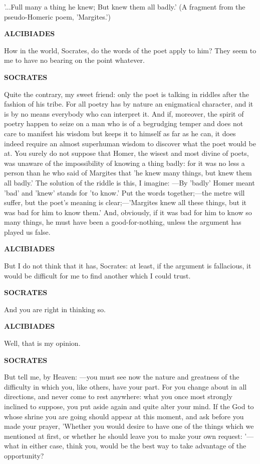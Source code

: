 \documentclass[11pt,letter]{article}
\begin{document}
\par  '...Full many a thing he knew; But knew them all badly.' (A fragment from the pseudo-Homeric poem, 'Margites.')

\par \textbf{ALCIBIADES}
\par   How in the world, Socrates, do the words of the poet apply to him? They seem to me to have no bearing on the point whatever.

\par \textbf{SOCRATES}
\par   Quite the contrary, my sweet friend:  only the poet is talking in riddles after the fashion of his tribe. For all poetry has by nature an enigmatical character, and it is by no means everybody who can interpret it. And if, moreover, the spirit of poetry happen to seize on a man who is of a begrudging temper and does not care to manifest his wisdom but keeps it to himself as far as he can, it does indeed require an almost superhuman wisdom to discover what the poet would be at. You surely do not suppose that Homer, the wisest and most divine of poets, was unaware of the impossibility of knowing a thing badly:  for it was no less a person than he who said of Margites that 'he knew many things, but knew them all badly.' The solution of the riddle is this, I imagine: —By 'badly' Homer meant 'bad' and 'knew' stands for 'to know.' Put the words together;—the metre will suffer, but the poet's meaning is clear;—'Margites knew all these things, but it was bad for him to know them.' And, obviously, if it was bad for him to know so many things, he must have been a good-for-nothing, unless the argument has played us false.

\par \textbf{ALCIBIADES}
\par   But I do not think that it has, Socrates:  at least, if the argument is fallacious, it would be difficult for me to find another which I could trust.

\par \textbf{SOCRATES}
\par   And you are right in thinking so.

\par \textbf{ALCIBIADES}
\par   Well, that is my opinion.

\par \textbf{SOCRATES}
\par   But tell me, by Heaven: —you must see now the nature and greatness of the difficulty in which you, like others, have your part. For you change about in all directions, and never come to rest anywhere:  what you once most strongly inclined to suppose, you put aside again and quite alter your mind. If the God to whose shrine you are going should appear at this moment, and ask before you made your prayer, 'Whether you would desire to have one of the things which we mentioned at first, or whether he should leave you to make your own request: '—what in either case, think you, would be the best way to take advantage of the opportunity?
\end{document}
